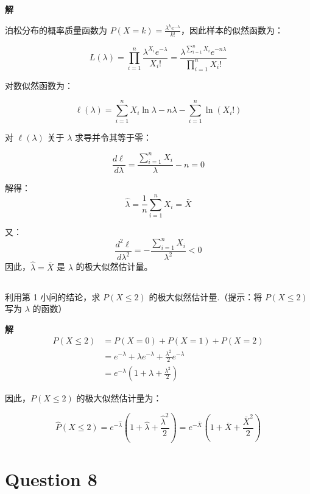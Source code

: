 \documentclass[12pt,a4paper]{article}
\begin{document}
\begin{answerbox}
\textbf{解}  

  泊松分布的概率质量函数为 $P(X=k) = \frac{\lambda^k e^{-\lambda}}{k!}$，因此样本的似然函数为：

  $$
  L(\lambda) = \prod_{i=1}^n \frac{\lambda^{X_i} e^{-\lambda}}{X_i!} = \frac{\lambda^{\sum_{i=1}^n X_i} e^{-n\lambda}}{\prod_{i=1}^n X_i!}
  $$

  对数似然函数为：

  $$
  \ell(\lambda) = \sum_{i=1}^n X_i \ln \lambda - n\lambda - \sum_{i=1}^n \ln(X_i!)
  $$

  对 $\ell(\lambda)$ 关于 $\lambda$ 求导并令其等于零：

  $$
  \frac{d\ell}{d\lambda} = \frac{\sum_{i=1}^n X_i}{\lambda} - n = 0
  $$

  解得：
  $$\hat{\lambda} = \frac{1}{n}\sum_{i=1}^n X_i = \bar{X}$$

  又：
  $$
  \frac{d^2\ell}{d\lambda^2} = -\frac{\sum_{i=1}^n X_i}{\lambda^2} < 0
  $$
  因此，$\hat{\lambda} = \bar{X}$ 是 $\lambda$ 的极大似然估计量。

\end{answerbox}

\subsection{}

利用第 1 小问的结论，求 $P(X\le 2)$ 的极大似然估计量.（提示：将 $P(X\le 2)$ 写为 $\lambda$ 的函数）

\begin{answerbox}
\textbf{解}  
  $$
  \begin{aligned}
  P(X \le 2) &= P(X=0) + P(X=1) + P(X=2) \\
  &= e^{-\lambda} + \lambda e^{-\lambda} + \frac{\lambda^2}{2} e^{-\lambda} \\
  &= e^{-\lambda}\left(1 + \lambda + \frac{\lambda^2}{2}\right)
  \end{aligned}
  $$

  因此，$P(X\le 2)$ 的极大似然估计量为：

  $$
  \hat{P}(X\le 2) = e^{-\hat{\lambda}}\left(1 + \hat{\lambda} + \frac{\hat{\lambda}^2}{2}\right) = e^{-\bar{X}}\left(1 + \bar{X} + \frac{\bar{X}^2}{2}\right)
  $$
\end{answerbox}

\section{Question 8}
\end{document}
